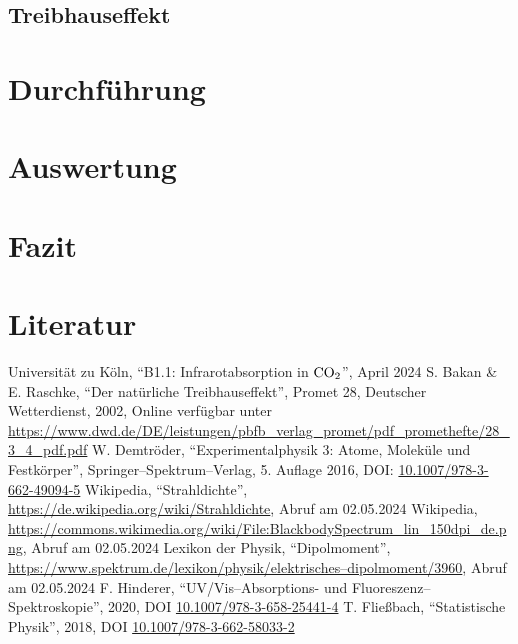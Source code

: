 \documentclass[12pt,a4paper]{scrartcl}
\numberwithin{equation}{section} %
\renewcommand{\[}{} %
\renewcommand{\]}{\noindent} %
\begin{document}
\hypertarget{treibhauseffekt}{%
\subsection{Treibhauseffekt}\label{treibhauseffekt}}

\clearpage
\hypertarget{durchfuxfchrung}{%
\section{Durchführung}\label{durchfuxfchrung}}

\clearpage
\hypertarget{auswertung}{%
\section{Auswertung}\label{auswertung}}

\clearpage
\hypertarget{fazit}{%
\section{Fazit}\label{fazit}}

\clearpage
\hypertarget{literatur}{%
\section{Literatur}\label{literatur}}
\renewcommand{\section}[2]{} %
\begin{thebibliography}{9}
	Universität zu Köln, ``B1.1: Infrarotabsorption in \(\ce{CO_2}\)'', April 2024
  S. Bakan \& E. Raschke, ``Der natürliche Treibhauseffekt'', Promet 28,
	Deutscher Wetterdienst, 2002, Online verfügbar unter
	\url{https://www.dwd.de/DE/leistungen/pbfb_verlag_promet/pdf_promethefte/28_3_4_pdf.pdf}
	W. Demtröder, ``Experimentalphysik 3: Atome, Moleküle und Festkörper'',
	Springer--Spektrum--Verlag, 5. Auflage 2016, DOI:
	\href{https://doi.org/10.1007/978-3-662-49094-5}{10.1007/978-3-662-49094-5}
	Wikipedia, ``Strahldichte'',
	\url{https://de.wikipedia.org/wiki/Strahldichte}, Abruf am 02.05.2024
	Wikipedia, \url{https://commons.wikimedia.org/wiki/File:BlackbodySpectrum_lin_150dpi_de.png},
	Abruf am 02.05.2024
	Lexikon der Physik, ``Dipolmoment'',
	\href{https://www.spektrum.de/lexikon/physik/elektrisches--dipolmoment/3960}{https://www.spektrum.de/lexikon/physik/elektrisches--dipolmoment/3960},
	Abruf am 02.05.2024
	F. Hinderer, ``UV/Vis--Absorptions- und Fluoreszenz--Spektroskopie'',
	2020, DOI \href{https://doi.org/10.1007/978-3-658-25441-4}{10.1007/978-3-658-25441-4}
	T. Fließbach, ``Statistische Physik'', 2018, DOI
	\href{https://doi.org/10.1007/978-3-662-58033-2}{10.1007/978-3-662-58033-2}
\end{thebibliography}
\end{document}
